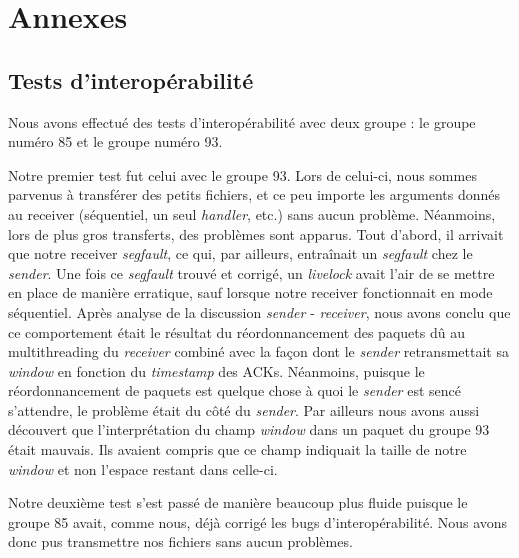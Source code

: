 \documentclass[../main.tex]{subfiles}
\begin{document}
\section{Annexes}
\label{sec:annexes}

\subsection{Tests d'interopérabilité}
\label{sec:interop}

Nous avons effectué des tests d'interopérabilité avec deux groupe : le groupe numéro 85 et le groupe numéro 93. 

Notre premier test fut celui avec le groupe 93. Lors de celui-ci, nous sommes parvenus à transférer des petits fichiers, et ce peu 
importe les arguments donnés au receiver (séquentiel, un seul \textit{handler}, etc.) sans aucun problème. Néanmoins, lors de plus gros transferts, 
des problèmes sont apparus.
Tout d'abord, il arrivait que notre receiver \textit{segfault}, ce qui, par ailleurs, entraînait un \textit{segfault} chez le \textit{sender}.
Une fois ce \textit{segfault} trouvé et corrigé, un \textit{livelock} avait l'air de se mettre en place de manière erratique, sauf lorsque 
notre receiver fonctionnait en mode séquentiel. Après analyse de la discussion \textit{sender} - \textit{receiver}, nous avons conclu
que ce comportement était le résultat du réordonnancement des paquets dû au multithreading du \textit{receiver} combiné avec la façon dont le 
\textit{sender} retransmettait sa \textit{window} en fonction du \textit{timestamp} des ACKs. Néanmoins, puisque le réordonnancement de paquets 
est quelque chose à quoi le \textit{sender} est sencé s'attendre, le problème était du côté du \textit{sender}. Par ailleurs nous avons aussi découvert 
que l'interprétation du champ \textit{window} dans un paquet du groupe 93 était mauvais. Ils avaient compris que ce champ indiquait la taille de notre 
\textit{window} et non l'espace restant dans celle-ci.

Notre deuxième test s'est passé de manière beaucoup plus fluide puisque le groupe 85 avait, comme nous, déjà corrigé les bugs d'interopérabilité.
Nous avons donc pus transmettre nos fichiers sans aucun problèmes.
\end{document}
